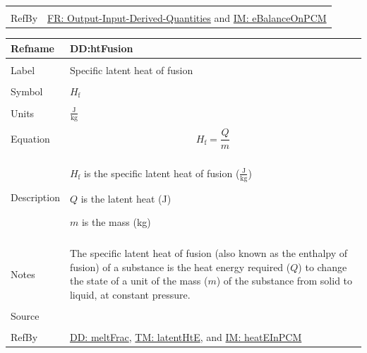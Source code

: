\documentclass[12pt]{article}
\begin{document}
\begin{minipage}{\textwidth}
\begin{tabular}{>{\raggedright}p{}>{\raggedright\arraybackslash}p{}}
\\ \midrule \\
RefBy & \hyperref[outputInputDerivQuants]{FR: Output-Input-Derived-Quantities} and \hyperref[IM:eBalanceOnPCM]{IM: eBalanceOnPCM}
        
\\ \bottomrule
\end{tabular}
\end{minipage}

\vspace{\baselineskip}
\noindent
\begin{minipage}{\textwidth}
\begin{tabular}{>{\raggedright}p{}>{\raggedright\arraybackslash}p{}}
\toprule \textbf{Refname} & \textbf{DD:htFusion}
\label{DD:htFusion}
\\ \midrule \\
Label & Specific latent heat of fusion
        
\\ \midrule \\
Symbol & ${H_{\text{f}}}$
         
\\ \midrule \\
Units & $\frac{\text{J}}{\text{kg}}$
        
\\ \midrule \\
Equation & \begin{displaymath}
           {H_{\text{f}}}=\frac{Q}{m}
           \end{displaymath}
\\ \midrule \\
Description & \begin{symbDescription}
              \item{${H_{\text{f}}}$ is the specific latent heat of fusion ($\frac{\text{J}}{\text{kg}}$)}
              \item{$Q$ is the latent heat (J)}
              \item{$m$ is the mass (kg)}
              \end{symbDescription}
\\ \midrule \\
Notes & The specific latent heat of fusion (also known as the enthalpy of fusion) of a substance is the heat energy required ($Q$) to change the state of a unit of the mass ($m$) of the substance from solid to liquid, at constant pressure.
        
\\ \midrule \\
Source & \cite[(pg. 282)]{bueche1986}
         
\\ \midrule \\
RefBy & \hyperref[DD:meltFrac]{DD: meltFrac}, \hyperref[TM:latentHtE]{TM: latentHtE}, and \hyperref[IM:heatEInPCM]{IM: heatEInPCM}
        
\\ \bottomrule
\end{tabular}
\end{minipage}
\end{document}
